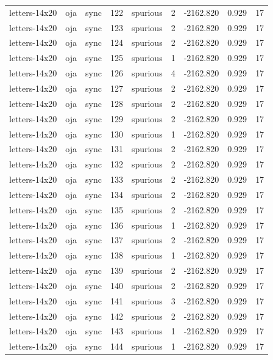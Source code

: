 \begin{tabular}{lllrlrrrr}
letters-14x20 & oja & sync & 122 & spurious & 2 & -2162.820 & 0.929 & 17 \\
letters-14x20 & oja & sync & 123 & spurious & 2 & -2162.820 & 0.929 & 17 \\
letters-14x20 & oja & sync & 124 & spurious & 2 & -2162.820 & 0.929 & 17 \\
letters-14x20 & oja & sync & 125 & spurious & 1 & -2162.820 & 0.929 & 17 \\
letters-14x20 & oja & sync & 126 & spurious & 4 & -2162.820 & 0.929 & 17 \\
letters-14x20 & oja & sync & 127 & spurious & 2 & -2162.820 & 0.929 & 17 \\
letters-14x20 & oja & sync & 128 & spurious & 2 & -2162.820 & 0.929 & 17 \\
letters-14x20 & oja & sync & 129 & spurious & 2 & -2162.820 & 0.929 & 17 \\
letters-14x20 & oja & sync & 130 & spurious & 1 & -2162.820 & 0.929 & 17 \\
letters-14x20 & oja & sync & 131 & spurious & 2 & -2162.820 & 0.929 & 17 \\
letters-14x20 & oja & sync & 132 & spurious & 2 & -2162.820 & 0.929 & 17 \\
letters-14x20 & oja & sync & 133 & spurious & 2 & -2162.820 & 0.929 & 17 \\
letters-14x20 & oja & sync & 134 & spurious & 2 & -2162.820 & 0.929 & 17 \\
letters-14x20 & oja & sync & 135 & spurious & 2 & -2162.820 & 0.929 & 17 \\
letters-14x20 & oja & sync & 136 & spurious & 1 & -2162.820 & 0.929 & 17 \\
letters-14x20 & oja & sync & 137 & spurious & 2 & -2162.820 & 0.929 & 17 \\
letters-14x20 & oja & sync & 138 & spurious & 1 & -2162.820 & 0.929 & 17 \\
letters-14x20 & oja & sync & 139 & spurious & 2 & -2162.820 & 0.929 & 17 \\
letters-14x20 & oja & sync & 140 & spurious & 2 & -2162.820 & 0.929 & 17 \\
letters-14x20 & oja & sync & 141 & spurious & 3 & -2162.820 & 0.929 & 17 \\
letters-14x20 & oja & sync & 142 & spurious & 2 & -2162.820 & 0.929 & 17 \\
letters-14x20 & oja & sync & 143 & spurious & 1 & -2162.820 & 0.929 & 17 \\
letters-14x20 & oja & sync & 144 & spurious & 1 & -2162.820 & 0.929 & 17 \\

\end{tabular}
